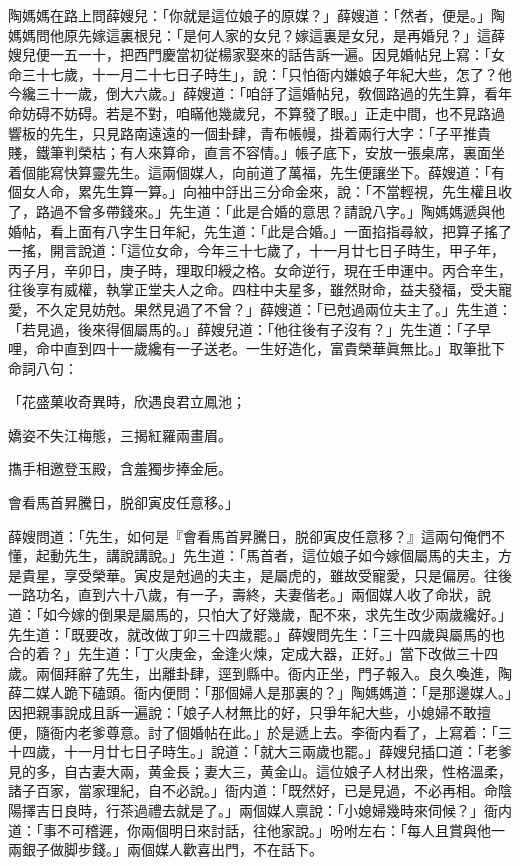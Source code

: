 陶媽媽在路上問薛嫂兒：「你就是這位娘子的原媒？」薛嫂道：「然者，便是。」陶媽媽問他原先嫁這裏根兒：「是何人家的女兒？嫁這裏是女兒，是再婚兒？」這薛嫂兒便一五一十，把西門慶當初従楊家娶來的話告訴一遍。因見婚帖兒上寫：「女命三十七歲，十一月二十七日子時生」，說：「只怕衙内嫌娘子年紀大些，怎了？他今纔三十一歲，倒大六歲。」薛嫂道：「咱㧱了這婚帖兒，敎個路過的先生算，看年命妨碍不妨碍。若是不對，咱瞞他幾歲兒，不算發了眼。」正走中間，也不見路過響板的先生，只見路南遠遠的一個卦肆，青布帳幔，掛着兩行大字：「子平推貴賤，鐵筆判榮枯；有人來算命，直言不容情。」帳子底下，安放一張桌席，裏面坐着個能寫快算靈先生。這兩個媒人，向前道了萬福，先生便讓坐下。薛嫂道：「有個女人命，累先生算一算。」向袖中㧱出三分命金來，說：「不當輕視，先生權且收了，路過不曾多帶錢來。」先生道：「此是合婚的意思？請說八字。」陶媽媽遞與他婚帖，看上面有八字生日年紀，先生道：「此是合婚。」一面掐指尋紋，把算子搖了一搖，開言說道：「這位女命，今年三十七歲了，十一月廿七日子時生，甲子年，丙子月，辛卯日，庚子時，理取印綬之格。女命逆行，現在壬申運中。丙合辛生，往後享有威權，執掌正堂夫人之命。四柱中夫星多，雖然財命，益夫發福，受夫寵愛，不久定見妨尅。果然見過了不曾？」薛嫂道：「已尅過兩位夫主了。」先生道：「若見過，後來得個屬馬的。」薛嫂兒道：「他往後有子沒有？」先生道：「子早哩，命中直到四十一歲纔有一子送老。一生好造化，富貴榮華眞無比。」取筆批下命詞八句：

\begin{myquote}
「花盛菓收奇異時，欣遇良君立鳳池；

嬌姿不失江梅態，三揭紅羅兩畫眉。

㩦手相邀登玉殿，含羞獨步捧金巵。

會看馬首昇騰日，脱卻寅皮任意移。」
\end{myquote}

薛嫂問道：「先生，如何是『會看馬首昇騰日，脱卻寅皮任意移？』這兩句俺們不懂，起動先生，講說講說。」先生道：「馬首者，這位娘子如今嫁個屬馬的夫主，方是貴星，享受榮華。寅皮是尅過的夫主，是屬虎的，雖故受寵愛，只是偏房。往後一路功名，直到六十八歲，有一子，壽終，夫妻偕老。」兩個媒人收了命狀，說道：「如今嫁的倒果是屬馬的，只怕大了好幾歲，配不來，求先生改少兩歲纔好。」先生道：「既要改，就改做丁卯三十四歲罷。」薛嫂問先生：「三十四歲與屬馬的也合的着？」先生道：「丁火庚金，金逢火煉，定成大器，正好。」當下改做三十四歲。兩個拜辭了先生，出離卦肆，逕到縣中。衙内正坐，門子報入。良久喚進，陶薛二媒人跪下磕頭。衙内便問：「那個婦人是那裏的？」陶媽媽道：「是那邊媒人。」因把親事說成且訴一遍說：「娘子人材無比的好，只爭年紀大些，小媳婦不敢擅便，隨衙内老爹尊意。討了個婚帖在此。」於是遞上去。李衙内看了，上寫着：「三十四歲，十一月廿七日子時生。」說道：「就大三兩歲也罷。」薛嫂兒插口道：「老爹見的多，自古妻大兩，黄金長；妻大三，黄金山。這位娘子人材出衆，性格溫柔，諸子百家，當家理紀，自不必說。」衙内道：「既然好，已是見過，不必再相。命陰陽擇吉日良時，行茶過禮去就是了。」兩個媒人禀說：「小媳婦幾時來伺候？」衙内道：「事不可稽遲，你兩個明日來討話，往他家說。」吩咐左右：「每人且賞與他一兩銀子做脚步錢。」兩個媒人歡喜出門，不在話下。

